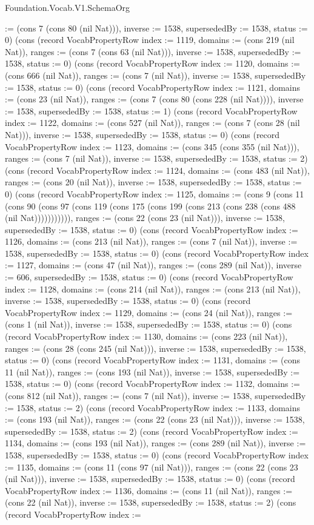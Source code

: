\begin{lexlean}{Foundation.Vocab.V1.SchemaOrg}
\begin{semanticmodule}
{:= (cons 7 (cons 80 (nil Nat))), inverse := 1538, supersededBy := 1538, status := 0}) (cons (record VocabPropertyRow {index := 1119, domains := (cons 219 (nil Nat)), ranges := (cons 7 (cons 63 (nil Nat))), inverse := 1538, supersededBy := 1538, status := 0}) (cons (record VocabPropertyRow {index := 1120, domains := (cons 666 (nil Nat)), ranges := (cons 7 (nil Nat)), inverse := 1538, supersededBy := 1538, status := 0}) (cons (record VocabPropertyRow {index := 1121, domains := (cons 23 (nil Nat)), ranges := (cons 7 (cons 80 (cons 228 (nil Nat)))), inverse := 1538, supersededBy := 1538, status := 1}) (cons (record VocabPropertyRow {index := 1122, domains := (cons 527 (nil Nat)), ranges := (cons 7 (cons 28 (nil Nat))), inverse := 1538, supersededBy := 1538, status := 0}) (cons (record VocabPropertyRow {index := 1123, domains := (cons 345 (cons 355 (nil Nat))), ranges := (cons 7 (nil Nat)), inverse := 1538, supersededBy := 1538, status := 2}) (cons (record VocabPropertyRow {index := 1124, domains := (cons 483 (nil Nat)), ranges := (cons 20 (nil Nat)), inverse := 1538, supersededBy := 1538, status := 0}) (cons (record VocabPropertyRow {index := 1125, domains := (cons 9 (cons 11 (cons 90 (cons 97 (cons 119 (cons 175 (cons 199 (cons 213 (cons 238 (cons 488 (nil Nat))))))))))), ranges := (cons 22 (cons 23 (nil Nat))), inverse := 1538, supersededBy := 1538, status := 0}) (cons (record VocabPropertyRow {index := 1126, domains := (cons 213 (nil Nat)), ranges := (cons 7 (nil Nat)), inverse := 1538, supersededBy := 1538, status := 0}) (cons (record VocabPropertyRow {index := 1127, domains := (cons 47 (nil Nat)), ranges := (cons 289 (nil Nat)), inverse := 606, supersededBy := 1538, status := 0}) (cons (record VocabPropertyRow {index := 1128, domains := (cons 214 (nil Nat)), ranges := (cons 213 (nil Nat)), inverse := 1538, supersededBy := 1538, status := 0}) (cons (record VocabPropertyRow {index := 1129, domains := (cons 24 (nil Nat)), ranges := (cons 1 (nil Nat)), inverse := 1538, supersededBy := 1538, status := 0}) (cons (record VocabPropertyRow {index := 1130, domains := (cons 223 (nil Nat)), ranges := (cons 28 (cons 245 (nil Nat))), inverse := 1538, supersededBy := 1538, status := 0}) (cons (record VocabPropertyRow {index := 1131, domains := (cons 11 (nil Nat)), ranges := (cons 193 (nil Nat)), inverse := 1538, supersededBy := 1538, status := 0}) (cons (record VocabPropertyRow {index := 1132, domains := (cons 812 (nil Nat)), ranges := (cons 7 (nil Nat)), inverse := 1538, supersededBy := 1538, status := 2}) (cons (record VocabPropertyRow {index := 1133, domains := (cons 193 (nil Nat)), ranges := (cons 22 (cons 23 (nil Nat))), inverse := 1538, supersededBy := 1538, status := 2}) (cons (record VocabPropertyRow {index := 1134, domains := (cons 193 (nil Nat)), ranges := (cons 289 (nil Nat)), inverse := 1538, supersededBy := 1538, status := 0}) (cons (record VocabPropertyRow {index := 1135, domains := (cons 11 (cons 97 (nil Nat))), ranges := (cons 22 (cons 23 (nil Nat))), inverse := 1538, supersededBy := 1538, status := 0}) (cons (record VocabPropertyRow {index := 1136, domains := (cons 11 (nil Nat)), ranges := (cons 22 (nil Nat)), inverse := 1538, supersededBy := 1538, status := 2}) (cons (record VocabPropertyRow {index := }
\end{semanticmodule}
\end{lexlean}

